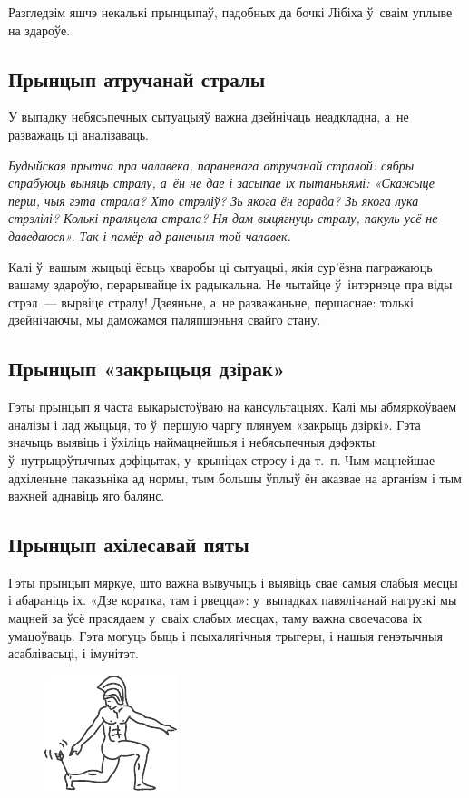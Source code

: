 Разгледзім яшчэ некалькі прынцыпаў, падобных да бочкі Лібіха ў~сваім уплыве на здароўе.

\subsection*{Прынцып атручанай стралы}

У выпадку небясьпечных сытуацыяў важна дзейнічаць неадкладна, а~не разважаць ці аналізаваць. 

\emph{Будыйская прытча пра чалавека, параненага атручанай стралой: сябры спрабуюць выняць стралу, а~ён не дае і засыпае іх пытаньнямі: «Скажыце перш, чыя гэта страла? Хто стрэліў? Зь якога ён горада? Зь якога лука стрэлілі? Колькі праляцела страла? Ня дам выцягнуць стралу, пакуль усё не даведаюся». Так і памёр ад раненьня той чалавек.}

Калі ў~вашым жыцьці ёсьць хваробы ці сытуацыі, якія сур'ёзна пагражаюць вашаму здароўю, перарывайце іх радыкальна. Не чытайце ў~інтэрнэце пра віды стрэл~--- вырвіце стралу! Дзеяньне, а~не разважаньне, першаснае: толькі дзейнічаючы, мы даможамся паляпшэньня свайго стану.

\subsection*{Прынцып «закрыцьця дзірак»}

Гэты прынцып я часта выкарыстоўваю на кансультацыях. Калі мы абмяркоўваем аналізы і лад жыцьця, то ў~першую чаргу плянуем «закрыць дзіркі». Гэта значыць выявіць і ўхіліць наймацнейшыя і небясьпечныя дэфэкты ў~нутрыцэўтычных дэфіцытах, у~крыніцах стрэсу і да т.~п. Чым мацнейшае адхіленьне паказьніка ад нормы, тым большы ўплыў ён аказвае на арганізм і тым важней аднавіць яго балянс.

\subsection*{Прынцып ахілесавай пяты}

Гэты прынцып мяркуе, што важна вывучыць і выявіць свае самыя слабыя месцы і абараніць іх. «Дзе коратка, там і рвецца»: у~выпадках павялічанай нагрузкі мы мацней за ўсё прасядаем у~сваіх слабых месцах, таму важна своечасова іх умацоўваць. Гэта могуць быць і псыхалягічныя трыгеры, і нашыя генэтычныя асаблівасьці, і імунітэт.

\begin{figure}[htb!]
  \centering
  \includegraphics[scale=1.5]{willpower/ch3/13.pdf}
\end{figure}

